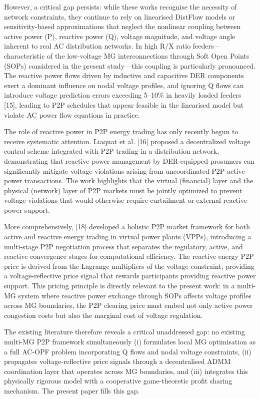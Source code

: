 \documentclass[preprint,12pt]{elsarticle}
\begin{document}
However, a critical gap persists: while these works recognise the necessity of network constraints, they continue to rely on linearised DistFlow models or sensitivity-based approximations that neglect the nonlinear coupling between active power (P), reactive power (Q), voltage magnitude, and voltage angle inherent to real AC distribution networks. In high R/X ratio feeders—characteristic of the low-voltage MG interconnections through Soft Open Points (SOPs) considered in the present study—this coupling is particularly pronounced. The reactive power flows driven by inductive and capacitive DER components exert a dominant influence on nodal voltage profiles, and ignoring Q flows can introduce voltage prediction errors exceeding 5–10\% in heavily loaded feeders [15], leading to P2P schedules that appear feasible in the linearised model but violate AC power flow equations in practice.

The role of reactive power in P2P energy trading has only recently begun to receive systematic attention. Liaquat et al. [16] proposed a decentralized voltage control scheme integrated with P2P trading in a distribution network, demonstrating that reactive power management by DER-equipped prosumers can significantly mitigate voltage violations arising from uncoordinated P2P active power transactions. The work highlights that the virtual (financial) layer and the physical (network) layer of P2P markets must be jointly optimized to prevent voltage violations that would otherwise require curtailment or external reactive power support.

More comprehensively, [18] developed a holistic P2P market framework for both active and reactive energy trading in virtual power plants (VPPs), introducing a multi-stage P2P negotiation process that separates the regulatory, active, and reactive convergence stages for computational efficiency. The reactive energy P2P price is derived from the Lagrange multipliers of the voltage constraint, providing a voltage-reflective price signal that rewards participants providing reactive power support. This pricing principle is directly relevant to the present work: in a multi-MG system where reactive power exchange through SOPs affects voltage profiles across MG boundaries, the P2P clearing price must embed not only active power congestion costs but also the marginal cost of voltage regulation.

The existing literature therefore reveals a critical unaddressed gap: no existing multi-MG P2P framework simultaneously (i) formulates local MG optimisation as a full AC-OPF problem incorporating Q flows and nodal voltage constraints, (ii) propagates voltage-reflective price signals through a decentralised ADMM coordination layer that operates across MG boundaries, and (iii) integrates this physically rigorous model with a cooperative game-theoretic profit sharing mechanism. The present paper fills this gap.
\end{document}
